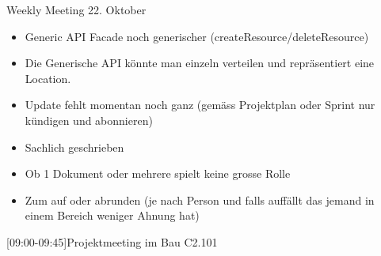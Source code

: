 \begin{Protokoll}{Weekly Meeting 22. Oktober}
\protokollKopf

\begin{itemize}
  \item Generic API Facade noch generischer (createResource/deleteResource)
  \item Die Generische API könnte man einzeln verteilen und repräsentiert eine Location.
\end{itemize}

\begin{itemize}
  \item Update fehlt momentan noch ganz (gemäss Projektplan oder Sprint nur kündigen und abonnieren)
\end{itemize}

\begin{itemize}
  \item Sachlich geschrieben
  \item Ob 1 Dokument oder mehrere spielt keine grosse Rolle
\end{itemize}

\begin{itemize}
  \item Zum auf oder abrunden (je nach Person und falls auffällt das jemand in einem Bereich weniger Ahnung hat)
\end{itemize}

[09:00-09:45]{Projektmeeting im Bau C2.101}


\end{Protokoll}